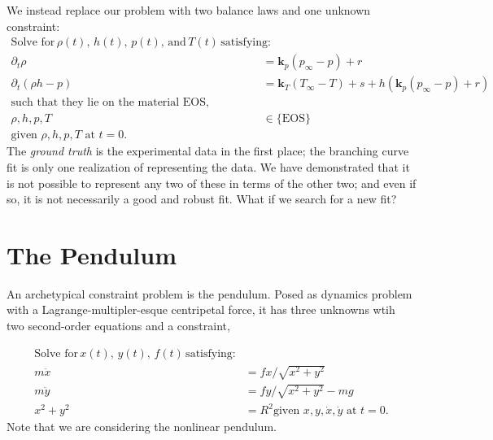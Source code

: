 \documentclass[]{article}
\begin{document}
We instead replace our problem with two balance laws and one unknown
constraint:
\begin{align}
\text{Solve for}\, \rho(t), \, h(t), \, p(t),\, \text{and}\, T(t)\,
  \text{satisfying:} \nonumber
                       \\
\partial_t \rho &  = \mathbf{k}_p(p_\infty - p) + r\\
\partial_t (\rho h-p) & = \mathbf{k}_T(T_\infty-T)  + s + h\left(\mathbf{k}_p(p_\infty - p) + r\right) \\
\text{such that they lie on the material EOS,}\nonumber
                                                \\
  \rho,h,p,T & \in \{\text{EOS}\}\\
  \text{given }\rho,h,p,T \text{ at } t=0. \nonumber
\end{align}
The \emph{ground truth} is the experimental data in the first place; the
branching curve fit is only one realization of representing the data. We
have demonstrated that it is not possible to represent any two of these
in terms of the other two; and even if so, it is not necessarily a good
and robust fit. What if we search for a new fit?

\hypertarget{header-n3267}{%
\section{The Pendulum}\label{header-n3267}}

An archetypical constraint problem is the pendulum. Posed as dynamics
problem with a Lagrange-multipler-esque centripetal force, it
has three unknowns wtih two second-order equations and a constraint,

\begin{align}
\text{Solve for}\, x(t), \, y(t), \, f(t) \, \text{satisfying:} \nonumber \\
m \ddot{x} & = f x/\sqrt{x^2+y^2} \\
m \ddot{y} & = f y/\sqrt{x^2+y^2} - m g \\
  x^2 + y^2 & = R^2
  \text{given } x,y, \dot{x},\dot{y} \text{ at } t=0. \nonumber
\end{align}
Note that we are considering the nonlinear pendulum.
\end{document}
